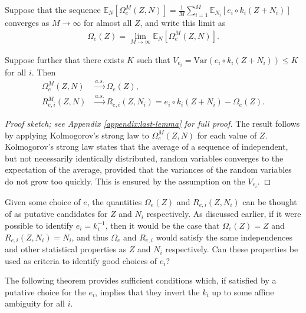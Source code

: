 \begin{lemma}\label{lem:last-lemma}
	Suppose that the sequence $\mathbb{E}_{N}[\Omega_{e}^M(Z, N)] = \frac{1}{M}\sum_{i=1}^M \mathbb{E}_{N_i}[{e}_i\circ {k}_i( Z + N_i)] $ converges as $M \to \infty$ for almost all $Z$, and write this limit as
	\begin{align*}
	\Omega_e(Z) = \lim_{M\to\infty}\mathbb{E}_{N}[\Omega_{e}^M(Z, N)].
	\end{align*}
	
	Suppose further that there exists $K$ such that $V_{e_i} = \mathrm{Var}\left({e}_i \circ {k}_i(Z + N_i) \right) \leq K$ for all $i$.
	Then
	\begin{align*}
	\Omega_{e}^M(Z, N) & \overset{a.s.}{\longrightarrow} \Omega_{e}(Z), \\
	R_{e, i}^M(Z, N) & \overset{a.s.}{\longrightarrow} R_{e, i}(Z, N_i) = {e}_i\circ {k}_i( Z + N_i) - \Omega_{e}(Z).
	\end{align*}
\end{lemma}
\begin{proof}[Proof sketch; see Appendix \ref{appendix:last-lemma} for full proof]
The result follows by applying Kolmogorov's strong law to $\Omega_{e}^M(Z, N)$ for each value of $Z$.
Kolmogorov's strong law states that the average of a sequence of independent, but not necessarily identically distributed, random variables converges to the expectation of the average, provided that the variances of the random variables do not grow too quickly. 
This is ensured by the assumption on the $V_{e_i}$.
\end{proof}


Given some choice of ${e}$, the quantities $\Omega_{e}(Z)$ and $R_{e, i}(Z, N_i)$ can be thought of as putative candidates for $Z$ and $N_i$ respectively.
As discussed earlier, if it were possible to identify ${e}_i={k}_i^{-1}$, then it would be the case that $\Omega_{e}(Z) = Z$ and $R_{e, i}(Z, N_i) = N_i$, and thus $\Omega_{e}$ and $R_{e, i}$ would satisfy the same independences and other statistical properties as $Z$ and $N_i$ respectively.
Can these properties be used as criteria to identify good choices of ${e}_i$?

The following theorem provides sufficient conditions which, if satisfied by a putative choice for the $e_i$, implies that they invert the $k_i$ up to some affine ambiguity for all $i$. 


